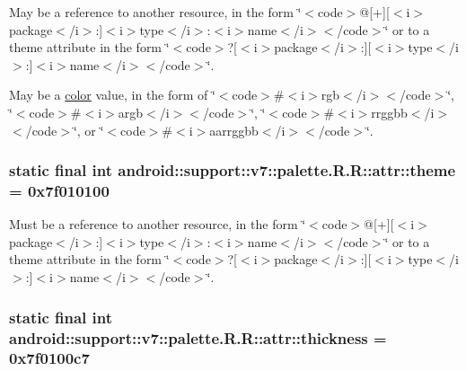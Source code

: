 May be a reference to another resource, in the form \char`\"{}$<$code$>$@\mbox{[}+\mbox{]}\mbox{[}$<$i$>$package$<$/i$>$:\mbox{]}$<$i$>$type$<$/i$>$:$<$i$>$name$<$/i$>$$<$/code$>$\char`\"{} or to a theme attribute in the form \char`\"{}$<$code$>$?\mbox{[}$<$i$>$package$<$/i$>$:\mbox{]}\mbox{[}$<$i$>$type$<$/i$>$:\mbox{]}$<$i$>$name$<$/i$>$$<$/code$>$\char`\"{}. 

May be a \hyperlink{classandroid_1_1support_1_1v7_1_1palette_1_1_r_1_1color}{color} value, in the form of \char`\"{}$<$code$>$\#$<$i$>$rgb$<$/i$>$$<$/code$>$\char`\"{}, \char`\"{}$<$code$>$\#$<$i$>$argb$<$/i$>$$<$/code$>$\char`\"{}, \char`\"{}$<$code$>$\#$<$i$>$rrggbb$<$/i$>$$<$/code$>$\char`\"{}, or \char`\"{}$<$code$>$\#$<$i$>$aarrggbb$<$/i$>$$<$/code$>$\char`\"{}. \hypertarget{classandroid_1_1support_1_1v7_1_1palette_1_1_r_1_1attr_3f57d39e54c1dc4c98baef5f96acb4bb}{
\subsubsection[{theme}]{\setlength{\rightskip}{0pt plus 5cm}static final int android::support::v7::palette.R.R::attr::theme = 0x7f010100}}
\label{classandroid_1_1support_1_1v7_1_1palette_1_1_r_1_1attr_3f57d39e54c1dc4c98baef5f96acb4bb}


Must be a reference to another resource, in the form \char`\"{}$<$code$>$@\mbox{[}+\mbox{]}\mbox{[}$<$i$>$package$<$/i$>$:\mbox{]}$<$i$>$type$<$/i$>$:$<$i$>$name$<$/i$>$$<$/code$>$\char`\"{} or to a theme attribute in the form \char`\"{}$<$code$>$?\mbox{[}$<$i$>$package$<$/i$>$:\mbox{]}\mbox{[}$<$i$>$type$<$/i$>$:\mbox{]}$<$i$>$name$<$/i$>$$<$/code$>$\char`\"{}. \hypertarget{classandroid_1_1support_1_1v7_1_1palette_1_1_r_1_1attr_1eb255fca4eefdd13f65d0ab7c9a4d27}{
\subsubsection[{thickness}]{\setlength{\rightskip}{0pt plus 5cm}static final int android::support::v7::palette.R.R::attr::thickness = 0x7f0100c7}}
\label{classandroid_1_1support_1_1v7_1_1palette_1_1_r_1_1attr_1eb255fca4eefdd13f65d0ab7c9a4d27}


